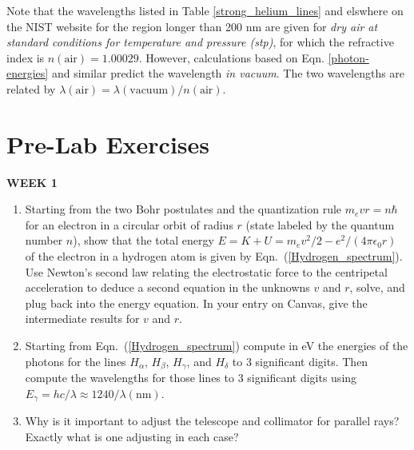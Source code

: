 \documentclass[12pt]{article}
\begin{document}
Note that the wavelengths listed in Table \ref{strong_helium_lines} and elswhere on the NIST website for the region longer than 200 nm are given for \textit{dry air at standard conditions for temperature and pressure (stp)}, for which the refractive index is $n(\text{air})=1.00029$. However, calculations based on Eqn. \ref{photon-energies} and similar predict the wavelength \textit{in vacuum}. The two wavelengths are related by $\lambda(\text{air}) = \lambda(\text{vacuum})/n(\text{air})$.

\newpage
\section{Pre-Lab Exercises}

\hfil \textbf{\large WEEK 1} \hfil
\begin{enumerate}
    \item Starting from the two Bohr postulates and the quantization rule $m_e v r = n\hbar$ for an electron in a circular orbit of radius $r$ (state labeled by the quantum number $n$), show that the total energy $E = K +U = m_e v^2/2 -e^2/(4\pi \epsilon_0 r)$ of the electron in a hydrogen atom is given by Eqn.~(\ref{Hydrogen_spectrum}).  Use Newton's second law relating the electrostatic force to the centripetal acceleration to deduce a second equation in the unknowns $v$ and $r$, solve, and plug back into the energy equation. In your entry on Canvas, give the intermediate results for $v$ and $r$.
    \item Starting from Eqn.~(\ref{Hydrogen_spectrum}) compute in eV the energies of the photons for the lines $H_{\alpha}$, $H_{\beta}$, $H_{\gamma}$, and $H_{\delta}$ to 3 significant digits. Then compute the wavelengths for those lines to 3 significant digits using $E_{\gamma} = hc/\lambda \approx 1240/\lambda(\text{nm})$.
    \item Why is it important to adjust the telescope and collimator for parallel rays? Exactly what is one adjusting in each case?
\end{enumerate}
\end{document}
